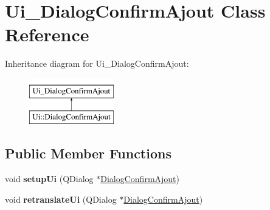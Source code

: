 \hypertarget{classUi__DialogConfirmAjout}{\section{Ui\-\_\-\-Dialog\-Confirm\-Ajout Class Reference}
\label{classUi__DialogConfirmAjout}
}
Inheritance diagram for Ui\-\_\-\-Dialog\-Confirm\-Ajout\-:\begin{figure}[H]
\begin{center}
\leavevmode
\includegraphics[height=2.000000cm]{classUi__DialogConfirmAjout}
\end{center}
\end{figure}
\subsection*{Public Member Functions}
\begin{DoxyCompactItemize}
\item 
\hypertarget{classUi__DialogConfirmAjout_a2c2e1f935ad91bb607af388752662dcb}{void {\bfseries setup\-Ui} (Q\-Dialog $\ast$\hyperlink{classDialogConfirmAjout}{Dialog\-Confirm\-Ajout})}\label{classUi__DialogConfirmAjout_a2c2e1f935ad91bb607af388752662dcb}

\item 
\hypertarget{classUi__DialogConfirmAjout_a4d7524ac0fda82ac0266539b94d36300}{void {\bfseries retranslate\-Ui} (Q\-Dialog $\ast$\hyperlink{classDialogConfirmAjout}{Dialog\-Confirm\-Ajout})}\label{classUi__DialogConfirmAjout_a4d7524ac0fda82ac0266539b94d36300}

\end{DoxyCompactItemize}
